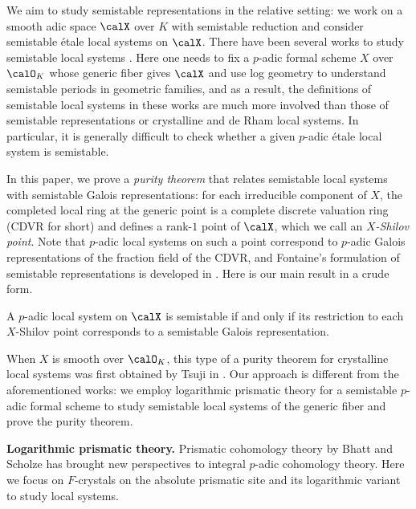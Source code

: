 We aim to study semistable representations in the relative setting: we work on a smooth adic space $\calX$ over $K$ with semistable reduction and consider semistable \'etale local systems on $\calX$.
There have been several works to study semistable local systems \cite{Faltings-CryscohandGalrep, faltings-almostetale, andreatta-iovita-semistable-relative, tsuji-cryst-shvs}. Here one needs to fix a $p$-adic formal scheme $X$ over $\calO_K$ whose generic fiber gives $\calX$ and use log geometry to understand semistable periods in geometric families, and as a result, the definitions of semistable local systems in these works are much more involved than those of semistable representations or crystalline and de Rham local systems. In particular, it is generally difficult to check whether a given $p$-adic \'etale local system is semistable. 

In this paper, we prove a \emph{purity theorem} that relates semistable local systems with semistable Galois representations: for each irreducible component of $X$, the completed local ring at the generic point is a complete discrete valuation ring (CDVR for short) and defines a rank-$1$ point of $\calX$, which we call an \emph{$X$-Shilov point}. Note that $p$-adic local systems on such a point correspond to $p$-adic Galois representations of the fraction field of the CDVR, and Fontaine's formulation of semistable representations is developed in \cite{fontaine-representations, Morita-imperfsemistable, Ohkubo}. Here is our main result in a crude form.

\begin{thm}\label{thm:intro purity for semistable local systems}
A $p$-adic local system on $\calX$ is semistable if and only if its restriction to each $X$-Shilov point corresponds to a semistable Galois representation.
\end{thm}

When $X$ is smooth over $\calO_K$, this type of a purity theorem for crystalline local systems was first obtained by Tsuji in \cite{tsuji-cryst-shvs}. Our approach is different from the aforementioned works: we employ logarithmic prismatic theory for a semistable $p$-adic formal scheme to study semistable local systems of the generic fiber and prove the purity theorem.


\medskip \noindent
\textbf{Logarithmic prismatic theory.}
Prismatic cohomology theory by Bhatt and Scholze 
\cite{bhatt-scholze-prismaticcohom} has brought new perspectives to integral $p$-adic cohomology theory. 
Here we focus on $F$-crystals on the absolute prismatic site and its logarithmic variant to study local systems.

